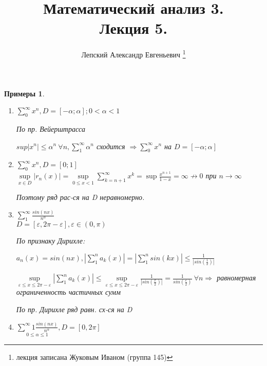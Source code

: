 \documentclass[a4paper, 12pt]{article}
\title{Математический анализ 3.\\Лекция 5.}
\author{Лепский Александр Евгеньевич
        \footnote{лекция записана Жуковым Иваном (группа 145)}}
\newtheorem{Examples}{Примеры}
\begin{document}
    \maketitle

    \begin{Examples}
    \leavevmode
        \begin{enumerate}
            \item
                \(\sum^{\infty}_{0} x^n, D =[-\alpha; \alpha]; 0 < \alpha < 1\)

                По пр. Вейерштрасса

                \( sup \left| x^n \right|  \le \alpha^n \ \forall n, 
                \sum^{\infty}_{1} \alpha^n\) сходится \( \Rightarrow
                \sum^{\infty}_{0} x^n\) на \(D = [-\alpha; \alpha]\)
            \item
                \( \sum^{\infty}_{0} x^n, D = [0; 1] \) \\
                \( \underset{x \in D}{\sup} \left| r_n(x) \right| =
                \underset{0 \le x < 1}{\sup} \sum^{\infty}_{k = n + 1} 
                x^k = \sup \frac{x ^ {n + 1}}{1 - x}
                = \infty \not \rightarrow 0\) при \(n \rightarrow \infty\)

                Поэтому ряд рас-ся на D неравномерно.

            \item
                \( \sum^{\infty}_{1} \frac{sin(nx)}{n ^ \alpha}\) \\
                \( D = [\varepsilon, 2\pi - \varepsilon], \varepsilon
                \in (0, \pi)\)

                По признаку Дирихле:

                \( a_n(x) = sin(nx), \left| \sum^{n}_{1} a_k(x) \right| =
                \left| \sum^{n}_{1}sin(kx) \right|
                \le \frac{1}{\left| sin(\frac{1}{2}) \right|}\)

                \( \underset{\varepsilon \le x \le 2\pi - \varepsilon}{\sup} 
                \left| \sum^{n}_{1} a_k(x) \right| \le
                \underset{\varepsilon \le x \le 2\pi - \varepsilon}{\sup}
                \frac{1}{\left| sin(\frac{x}{2}) \right|} =
                \frac{1}{sin(\frac{\varepsilon}{2})} \ \forall n \Rightarrow\)
                равномерная ограниченность частичных сумм

                По пр. Дирихле ряд равн. сх-ся на D

            \item
                \( \underset{0 \le \alpha \le 1}{\sum^{\infty}{1}
                \frac{sin(nx)}{n ^ \alpha}}, D = [0, 2\pi]\)


\end{enumerate}
\end{Examples}
\end{document}
